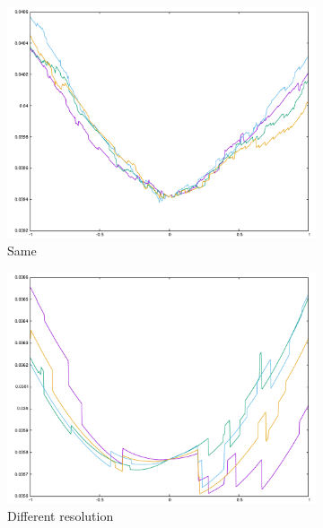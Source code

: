\begin{figure}[H]
\centering
\begin{subfigure}{.33\textwidth}
	\includegraphics[width=\linewidth]{fig/relief_same_err.pdf}
	\caption{Same}
\end{subfigure}%
\begin{subfigure}{.33\textwidth}
	\includegraphics[width=\linewidth]{fig/relief_hilo_err.pdf}
	\caption{Different resolution}
\end{subfigure}
\begin{subfigure}{.33\textwidth}

\end{subfigure}
\end{figure}
